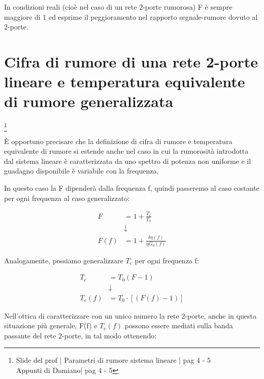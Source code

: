 In condizioni reali (cioè nel caso di un rete 2-porte rumorosa) F è sempre maggiore di 1 ed esprime il peggioramento nel rapporto segnale-rumore dovuto al 2-porte. \newline 

\newpage 

\section{Cifra di rumore di una rete 2-porte lineare e temperatura equivalente di rumore generalizzata}
\footnote{Slide del prof | Parametri di rumore sistema lineare | pag 4 - 5\\  
Appunti di Damiano| pag 4 - 5} 

È opportuno precisare che la definizione di cifra di rumore e temperatura equivalente di rumore si estende anche nel caso in cui la rumorosità introdotta dal sistema lineare è 
caratterizzata da uno spettro di potenza non uniforme e il guadagno disponibile è variabile con la frequenza. \newline 

In questo caso la F dipenderà dalla frequenza f, quindi passeremo al caso costante per ogni frequenza al caso generalizzato: 

{
    \Large 
    \begin{equation}
        \begin{split}
           F &= 1 + \frac{T_e}{T_0} 
           \\
           &\downarrow
           \\
        F(f) &= 1 + \frac{\delta \eta(f)}{\eta G_d (f)}
        \end{split}
    \end{equation}
}

Analogamente, possiamo generalizzare $T_e$ per ogni frequenza f: 

{
    \Large 
    \begin{equation}
        \begin{split}
        T_e 
        &=
        T_0 (F - 1) 
        \\
        &\downarrow
        \\
        T_e (f)
        &=
        T_0 \cdot [(F(f) - 1)] 
        \end{split}
    \end{equation}
}

Nell'ottica di caratterizzare con un unico numero la rete 2-porte, anche in questa situazione più generale, 
F(f) e $T_e (f)$ possono essere mediati sulla banda passante del rete 2-porte, 
in tal modo ottenendo: 


